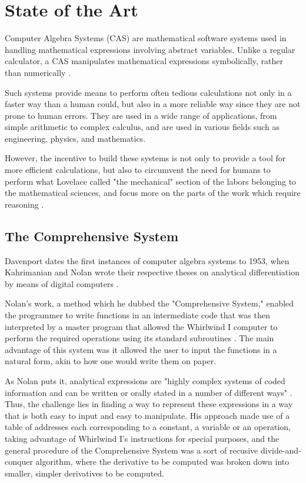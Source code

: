 \chapter{State of the Art}\label{chap:state-of-the-art}

Computer Algebra Systems (CAS) are mathematical software systems used in handling mathematical expressions involving abstract variables. Unlike a regular calculator, a CAS manipulates mathematical expressions symbolically, rather than numerically \parencite{bou2009computer}.

Such systems provide means to perform often tedious calculations not only in a faster way than a human could, but also in a more reliable way since they are not prone to human errors. They are used in a wide range of applications, from simple arithmetic to complex calculus, and are used in various fields such as engineering, physics, and mathematics.

However, the incentive to build these systems is not only to provide a tool for more efficient calculations, but also to circumvent the need for humans to perform what Lovelace called "the mechanical" section of the labors belonging to the mathematical sciences, and focus more on the parts of the work which require reasoning \parencite{lovelace1842sketch}.

\section{The Comprehensive System}\label{sec:the-comprehensive-system}

Davenport dates the first instances of computer algebra systems to 1953, when Kahrimanian and Nolan wrote their respective theses on analytical differentiation by means of digital computers \parencite{davenport1994computer}.

Nolan's work, a method which he dubbed the "Comprehensive System," enabled the programmer to write functions in an intermediate code that was then interpreted by a master program that allowed the Whirlwind I computer to perform the required operations using its standard subroutines \parencite{nolan1953analytical}. The main advantage of this system was it allowed the user to input the functions in a natural form, akin to how one would write them on paper.

As Nolan puts it, analytical expressions are "highly complex systems of coded information and can be written or orally stated in a number of different ways" \parencite{nolan1953analytical}. Thus, the challenge lies in finding a way to represent these expressions in a way that is both easy to input and easy to manipulate. His approach made use of a table of addresses each corresponding to a constant, a variable or an operation, taking advantage of Whirlwind I's instructions for special purposes, and the general procedure of the Comprehensive System was a sort of recusive divide-and-conquer algorithm, where the derivative to be computed was broken down into smaller, simpler derivatives to be computed.

